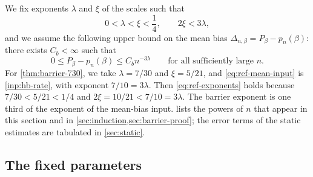 We fix exponents $\lambda$ and $\xi$ of the scales such that
\begin{equation}\label{eq:ref-exponents}
 0<\lambda<\xi<\frac14,\qquad 2\xi<3\lambda,
\end{equation}
and we assume the following upper bound on the mean bias
$\Delta_{n,\beta}=P_\beta-p_n(\beta)$: there exists $C_b<\infty$ such that
\begin{equation}\label{eq:ref-mean-input}
 0\le P_\beta-p_n(\beta)\le C_bn^{-3\lambda}
 \qquad\text{for all sufficiently large }n.
\end{equation}
For \cref{thm:barrier-730}, we take $\lambda=7/30$ and $\xi=5/21$, and
\eqref{eq:ref-mean-input} is \cref{inp:hb-rate}, with exponent $7/10=3\lambda$.
Then \eqref{eq:ref-exponents} holds because $7/30<5/21<1/4$ and
$2\xi=10/21<7/10=3\lambda$. The barrier exponent is one
third of the exponent of the mean-bias input. 
lists the powers of $n$ that appear in this section and in
\cref{sec:induction,sec:barrier-proof}; the error terms of the static
estimates are tabulated in \cref{sec:static}.

\subsection{The fixed parameters}

